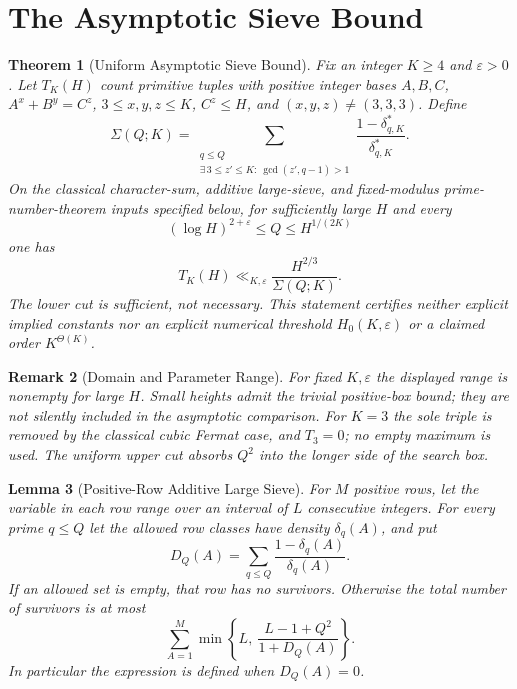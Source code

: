 \documentclass[11pt,a4paper]{article}
\newtheorem{theorem}{Theorem}[section]
\newtheorem{lemma}[theorem]{Lemma}
\newtheorem{remark}[theorem]{Remark}
\begin{document}
\section{The Asymptotic Sieve Bound}
\label{sec:sieve}

\begin{theorem}[Uniform Asymptotic Sieve Bound]
\label{thm:sieve}
Fix an integer $K\ge4$ and $\varepsilon>0$. Let $T_K(H)$ count
primitive tuples with \emph{positive integer} bases $A,B,C$,
$A^x+B^y=C^z$, $3\le x,y,z\le K$, $C^z\le H$, and
$(x,y,z)\ne(3,3,3)$. Define
\[
 \Sigma(Q;K)=
 \sum_{\substack{q\le Q\\
      \exists\,3\le z'\le K:\ \gcd(z',q-1)>1}}
       \frac{1-\delta_{q,K}^{*}}{\delta_{q,K}^{*}}.
\]
On the classical character-sum, additive large-sieve, and fixed-modulus
prime-number-theorem inputs specified below, for sufficiently large
$H$ and every
\[
 (\log H)^{2+\varepsilon}\le Q\le H^{1/(2K)}
\]
one has
\[
 T_K(H)\ll_{K,\varepsilon}\frac{H^{2/3}}{\Sigma(Q;K)}.
\]
The lower cut is sufficient, not necessary. This statement certifies
neither explicit implied constants nor an explicit numerical threshold
$H_0(K,\varepsilon)$ or a claimed order $K^{\Theta(K)}$.
\end{theorem}

\begin{remark}[Domain and Parameter Range]
For fixed $K,\varepsilon$ the displayed range is nonempty for large
$H$. Small heights admit the trivial positive-box bound; they are not
silently included in the asymptotic comparison. For $K=3$ the sole
triple is removed by the classical cubic Fermat case, and $T_3=0$;
no empty maximum is used. The uniform upper cut absorbs $Q^2$ into
the longer side of the search box.
\end{remark}

\begin{lemma}[Positive-Row Additive Large Sieve]
\label{lem:LS2}
For $M$ positive rows, let the variable in each row range over an
interval of $L$ consecutive integers. For every prime $q\le Q$ let
the allowed row classes have density $\delta_q(A)$, and put
\[
 D_Q(A)=\sum_{q\le Q}\frac{1-\delta_q(A)}{\delta_q(A)}.
\]
If an allowed set is empty, that row has no survivors. Otherwise
the total number of survivors is at most
\[
 \sum_{A=1}^{M}\min\left\{L,\
       \frac{L-1+Q^2}{1+D_Q(A)}\right\}.
\]
In particular the expression is defined when $D_Q(A)=0$.
\end{lemma}
\end{document}
